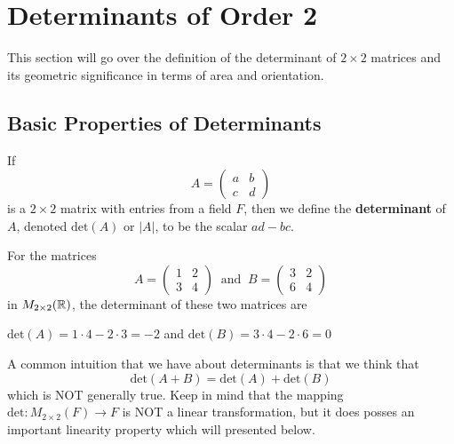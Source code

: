 \section{Determinants of Order 2}

This section will go over the definition of the determinant of \( 2 \times 2  \) matrices and its geometric significance in terms of area and orientation.

\subsection{Basic Properties of Determinants}

\begin{definition}[Determinants]
   If  
   \[  A = \begin{pmatrix}
       a & b \\
       c & d 
   \end{pmatrix} \] is a \( 2 \times 2  \) matrix with entries from a field \( F  \), then we define the \textbf{determinant} of \( A  \), denoted \( \text{det}(A)  \) or \( | A  |  \), to be the scalar \( ad - bc  \).
\end{definition}

\begin{eg}
    For the matrices
    \[  A = \begin{pmatrix}
        1 & 2 \\
        3 & 4 
    \end{pmatrix} \ \text{ and } \ B = \begin{pmatrix}
        3 & 2 \\
        6 & 4 
    \end{pmatrix} \] in \( {M}_{2 \times 2}(\mathbb{R}) \), the determinant of these two matrices are
    \begin{center}
        \( \text{det}(A) = 1 \cdot 4 - 2 \cdot 3 = -2  \) and \( \text{det}(B) = 3 \cdot 4 - 2 \cdot 6 = 0   \)
    \end{center}
\end{eg}

A common intuition that we have about determinants is that we think that
\[  \text{det}(A + B) = \text{det}(A) + \text{det}(B)  \]
which is NOT generally true. Keep in mind that the mapping \( \text{det} : {M}_{2 \times 2}(F) \to F   \) is NOT a linear transformation, but it does posses an important linearity property which will presented below.

